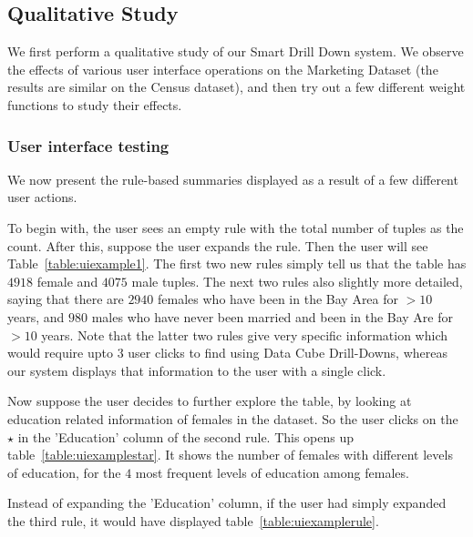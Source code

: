 \subsection{Qualitative Study}
We first perform a qualitative study of our Smart Drill Down system. We observe the effects of various user interface operations on the Marketing Dataset (the results are similar on the Census dataset), and then try out a few different weight functions to study their effects.
\subsubsection{User interface testing}
We now present the rule-based summaries displayed as a result of a few different user actions.

To begin with, the user sees an empty rule with the total number of tuples as the count. After this, suppose the user expands the rule. Then the user will see Table~\ref{table:uiexample1}. The first two new rules simply tell us that the table has $4918$ female and $4075$ male tuples. The next two rules also slightly more detailed, saying that there are $2940$ females who have been in the Bay Area for $> 10$ years, and $980$ males who have never been married and been in the Bay Are for $> 10$ years. Note that the latter two rules give very specific information which would require upto $3$ user clicks to find using Data Cube Drill-Downs, whereas our system displays that information to the user with a single click. 

Now suppose the user decides to further explore the table, by looking at education related information of females in the dataset. So the user clicks on the $\star$ in the 'Education' column of the second rule. This opens up table~\ref{table:uiexamplestar}. It shows the number of females with different levels of education, for the $4$ most frequent levels of education among females.

Instead of expanding the 'Education' column, if the user had simply expanded the third rule, it would have displayed table~\ref{table:uiexamplerule}. 

